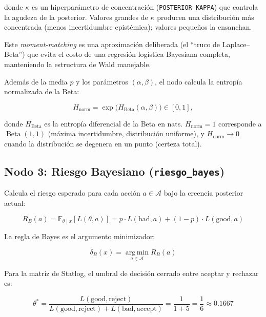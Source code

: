 \documentclass[11pt,a4paper]{article}
\theoremstyle{definition}
\newcommand{\E}{\mathbb{E}}
\newcommand{\A}{\mathcal{A}}
\newcommand{\Beta}{\operatorname{Beta}}
\begin{document}
donde $\kappa$ es un hiperparámetro de concentración (\texttt{POSTERIOR\_KAPPA})
que controla la agudeza de la posterior. Valores grandes de $\kappa$
producen una distribución más concentrada (menos incertidumbre epistémica);
valores pequeños la ensanchan.

Este \emph{moment-matching} es una aproximación deliberada (el
\enquote{truco de Laplace--Beta}) que evita el costo de una regresión
logística Bayesiana completa, manteniendo la estructura de Wald manejable.

Además de la media $p$ y los parámetros $(\alpha,\beta)$, el nodo calcula
la entropía normalizada de la Beta:

\begin{equation}\label{eq:entropy}
	H_{\text{norm}} = \exp\bigl(H_{\Beta}(\alpha,\beta)\bigr) \in [0,1],
\end{equation}

donde $H_{\Beta}$ es la entropía diferencial de la Beta en nats.
$H_{\text{norm}} = 1$ corresponde a $\Beta(1,1)$ (máxima incertidumbre,
distribución uniforme), y $H_{\text{norm}} \to 0$ cuando la distribución
se degenera en un punto (certeza total).

\subsection{Nodo 3: Riesgo Bayesiano (\texttt{riesgo\_bayes})}

Calcula el riesgo esperado para cada acción $a\in\A$ bajo la creencia
posterior actual:

\begin{equation}\label{eq:bayes-risk}
	R_B(a) = \E_{\theta\mid x}[L(\theta,a)]
	= p \cdot L(\text{bad},a) + (1-p) \cdot L(\text{good},a)
\end{equation}

La regla de Bayes es el argumento minimizador:

\begin{equation}\label{eq:bayes-rule}
	\delta_B(x) = \operatorname*{arg\,min}_{a\in\A} R_B(a)
\end{equation}

Para la matriz de Statlog, el umbral de decisión cerrado entre aceptar y
rechazar es:

\begin{equation}\label{eq:threshold}
	\theta^* = \frac{L(\text{good},\text{reject})}
	{L(\text{good},\text{reject}) + L(\text{bad},\text{accept})}
	= \frac{1}{1+5} = \frac{1}{6} \approx 0.1667
\end{equation}
\end{document}
